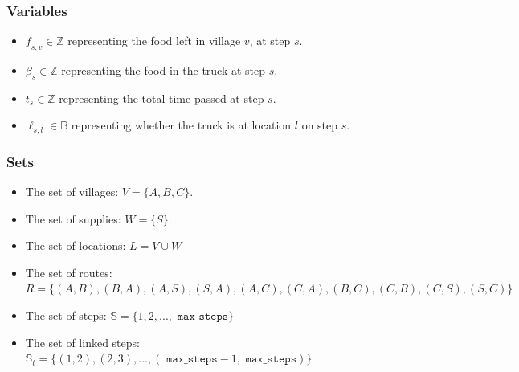         \subsubsection{Variables}
            \begin{itemize}
                \item
                    $\mathit{f}_{s,v} \in \mathbb{Z}$ representing the food left in
                    village $v$, at step $s$.
                \item
                    $\beta_{s} \in \mathbb{Z}$ representing the food in the
                    truck at step $s$.
                \item
                    $\mathit{t}_{s} \in \mathbb{Z}$ representing the total
                    time passed at step $s$.
                \item
                    $\ell_{s,l} \in \mathbb{B}$ representing whether the
                    truck is at location $l$ on step $s$.
            \end{itemize}

        \subsubsection{Sets}
            \begin{itemize}
                \item 
                    The set of villages: $V = \big\{ A, B, C \big\}$.
                \item 
                    The set of supplies: $W = \big\{ S \big\}$.
                \item
                    The set of locations: $L = V \cup W$
                \item
                    The set of routes: $R = \big\{
                        (A, B), (B, A),
                        (A, S), (S, A),
                        (A, C), (C, A),
                        (B, C), (C, B),
                        (C, S), (S, C)
                    \big\}$
                \item
                    The set of steps: $\mathbb{S} = \big\{
                        1, 2, ..., \texttt{ max\_steps}
                    \big\}$
                \item
                    The set of linked steps: $\mathbb{S}_t = \big\{
                        (1, 2), (2, 3), ..., 
                        (\texttt{ max\_steps} - 1,\texttt{ max\_steps})
                    \big\}$
            \end{itemize}

